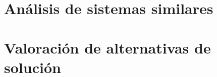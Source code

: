 \section{Análisis de sistemas similares}



\newpage
\section{Valoración de alternativas de solución} \label{sec:3_2-Alternativas-solucion}
\hypertarget{sec:3_2-Alternativas-solucion}{}
